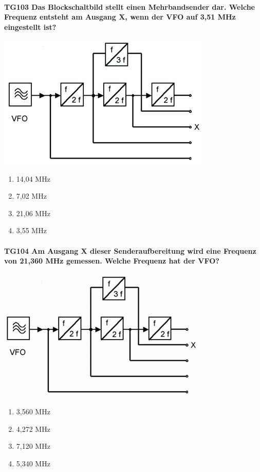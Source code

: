 \documentclass[8pt]{article}
\begin{document}
\paragraph*{TG103 Das Blockschaltbild stellt einen Mehrbandsender dar. Welche Frequenz entsteht am Ausgang X, wenn der VFO auf 3,51 MHz eingestellt ist?}
\begin{center}
	\begin{minipage}{\linewidth}
		\centering
		\includegraphics[scale=1.0]{pics/tg103_a.jpg}
	\end{minipage}
\end{center}
\begin{enumerate}[nolistsep,label=\Alph*]
\item 14,04 MHz
\item 7,02 MHz
\item 21,06 MHz
\item 3,55 MHz
\end{enumerate}

\paragraph*{TG104 Am Ausgang X dieser Senderaufbereitung wird eine Frequenz von 21,360 MHz gemessen. Welche Frequenz hat der VFO?}
\begin{center}
	\begin{minipage}{\linewidth}
		\centering
		\includegraphics[scale=1.0]{pics/tg104_a.jpg}
	\end{minipage}
\end{center}
\begin{enumerate}[nolistsep,label=\Alph*]
\item 3,560 MHz
\item 4,272 MHz
\item 7,120 MHz
\item 5,340 MHz
\end{enumerate}
\end{document}
